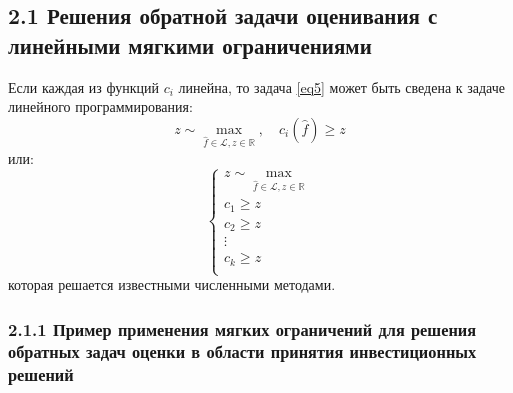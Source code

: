 \documentclass[12pt, a4paper, oneside]{article}
\begin{document}
		\subsection{2.1 Решения обратной задачи оценивания с линейными мягкими ограничениями}
			Если каждая из функций $c_i$ линейна, то задача \eqref{eq5} может быть сведена к задаче линейного программирования:
			\begin{equation}
				\label{eq6}
				z \sim \max_{\hat{f}\in\mathcal{L},z\in \mathbb{R}},\quad c_i(\hat{f})\ge z
			\end{equation}
			или:
			\begin{equation*}
			\left\{
			\begin{array}{lr}
				z \sim \displaystyle\max_{\hat{f}\in\mathcal{L},z\in \mathbb{R}}\\
				c_1 \ge z\\
				c_2 \ge z\\
				\vdots\\
				c_k \ge z\\
			\end{array}
			\right.
			\end{equation*}
			которая решается известными численными методами.
			\subsubsection{2.1.1 Пример применения мягких ограничений для решения обратных задач оценки в области принятия инвестиционных решений}
			
\end{document}

